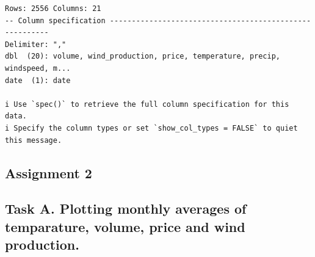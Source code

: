 \documentclass[
  letterpaper,
  DIV=11,
  numbers=noendperiod]{scrartcl}
\begin{document}
\begin{verbatim}
Rows: 2556 Columns: 21
-- Column specification --------------------------------------------------------
Delimiter: ","
dbl  (20): volume, wind_production, price, temperature, precip, windspeed, m...
date  (1): date

i Use `spec()` to retrieve the full column specification for this data.
i Specify the column types or set `show_col_types = FALSE` to quiet this message.
\end{verbatim}

\hypertarget{assignment-2}{%
\subsection{Assignment 2}\label{assignment-2}}

\hypertarget{task-a.-plotting-monthly-averages-of-temparature-volume-price-and-wind-production.}{%
\subsection{Task A. Plotting monthly averages of temparature, volume,
price and wind
production.}\label{task-a.-plotting-monthly-averages-of-temparature-volume-price-and-wind-production.}}
\end{document}
